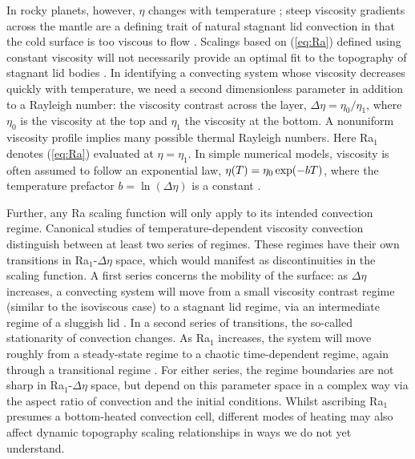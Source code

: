 \documentclass[trackchanges]{aastex63}
\newcommand{\jr}[1]{\textit{\textcolor{blue}{{#1}}}}
\begin{document}
In rocky planets, however, $\eta$ changes with temperature \citep{karato_rheology_1993}; steep viscosity gradients across the mantle are a defining trait of natural stagnant lid convection in that the cold surface is too viscous to flow \citep{davaille_transient_1993, solomatov_scaling_1995}. Scalings based on (\ref{eq:Ra}) defined using constant viscosity will not necessarily provide an optimal fit to the topography of stagnant lid bodies \citep{sembroni_impact_2017, bodur_impact_2019}. In identifying a convecting system whose viscosity decreases quickly with temperature, we need a second dimensionless parameter in addition to a Rayleigh number: the viscosity contrast across the layer, $\Delta \eta=\eta_0/\eta_1$, where $\eta_0$ is the viscosity at the top and $\eta_1$ the viscosity at the bottom. A nonuniform viscosity profile implies many possible thermal Rayleigh numbers. Here Ra$_1$ denotes (\ref{eq:Ra}) evaluated at $\eta=\eta_1$. In simple numerical models, viscosity is often assumed to follow an exponential law, $\eta(T) = \eta_0 \, {\rm exp}(-b T)$, where the temperature prefactor $b = \ln\left(\Delta \eta\right)$ is a constant \citep{solomatov_scaling_1995}. 

Further, any Ra scaling function will only apply to its intended convection regime. Canonical studies of temperature-dependent viscosity convection distinguish between at least two series of regimes. These regimes have their own transitions in Ra$_1$-$\Delta \eta$ space, which would manifest as discontinuities in the scaling function. %
A first series concerns the mobility of the surface: as $\Delta \eta$ increases, a convecting system will move from a small viscosity contrast regime (similar to the isoviscous case) to a stagnant lid regime, via an intermediate regime of a sluggish lid \citep{solomatov_scaling_1995, moresi_numerical_1995, kameyama_transitions_2000}. In a second series of transitions, the so-called stationarity of convection changes. As Ra$_1$ increases, the system will move roughly from a steady-state regime to a chaotic time-dependent regime, again through a transitional regime \citep{dumoulin_heat_1999, solomatov_scaling_2000}. For either series, the regime boundaries are not sharp in Ra$_1$-$\Delta \eta$ space, but depend on this parameter space in a complex way via the aspect ratio of convection and the initial conditions. Whilst ascribing Ra$_1$ presumes a bottom-heated convection cell, different modes of heating may also affect dynamic topography scaling relationships in ways we do not yet understand. 
\end{document}
